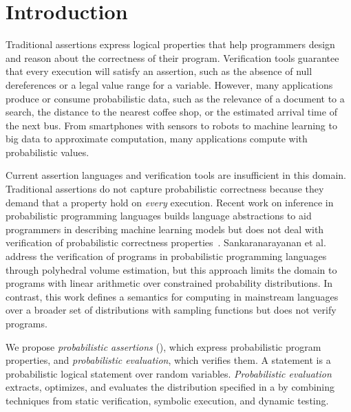 \section{Introduction}
Traditional assertions express logical properties that help programmers design and
reason about the correctness of their program. Verification tools
guarantee that every execution will satisfy an assertion, such as the
absence of null dereferences or a legal value range for a variable.
However, many applications produce or consume probabilistic data, such as the
relevance of a document to a search, the distance to the nearest
coffee shop,
or the estimated arrival time of the next bus. From smartphones with
sensors to robots to machine learning to big data to approximate
computation, many applications compute with probabilistic
values.  %

Current assertion languages and verification tools are insufficient in
this domain.  Traditional assertions do not capture probabilistic
correctness because they demand that a property hold on \emph{every}
execution.  Recent work on inference in probabilistic programming
languages builds language abstractions to aid programmers in describing
machine learning models but
does not deal with verification of probabilistic correctness
properties~\cite{infernet, church, pmonad, PPT:05}. Sankaranarayanan et al.~\cite{sriram-pldi} address the
verification of programs in probabilistic programming
languages through polyhedral volume estimation,
but this approach limits the domain to programs with linear arithmetic
over constrained probability distributions.
In contrast, this work
defines a semantics for computing in mainstream languages over a broader set of distributions
with sampling functions
but does not verify programs.

We propose \emph{probabilistic assertions}
(\passerts), which express probabilistic program properties, and
\emph{probabilistic evaluation}, which verifies them.  A \passert
statement is a probabilistic logical statement over random
variables. \emph{Probabilistic evaluation} extracts, optimizes, and
evaluates the distribution specified in a \passert by
combining techniques from static verification,
symbolic execution, and dynamic testing.

